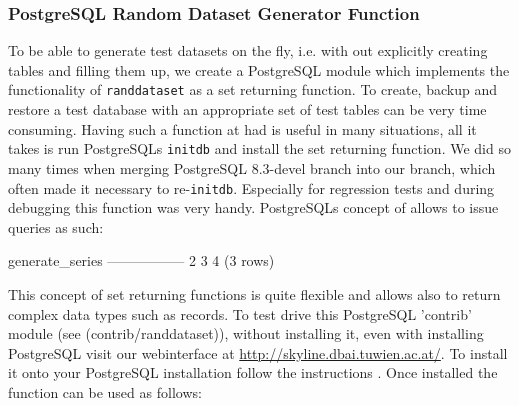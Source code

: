 \subsubsection{PostgreSQL Random Dataset Generator Function}

To be able to generate test datasets on the fly, i.e. with out
explicitly creating tables and filling them up, we create a PostgreSQL
module which implements the functionality of \texttt{randdataset} as a
set returning function. To create, backup and restore a test database
with an appropriate set of test tables can be very time
consuming. Having such a function at had is useful in many situations,
all it takes is run PostgreSQLs \texttt{initdb} and install the set
returning function. We did so many times when merging PostgreSQL
8.3-devel branch into our branch, which often made it necessary to
re-\texttt{initdb}. Especially for regression tests and during
debugging this function was very handy. PostgreSQLs concept of
 allows to
issue queries as such:

\begin{interactive}
 generate_series
-----------------
               2
               3
               4
(3 rows)
\end{interactive}

This concept of set returning functions is quite flexible and allows
also to return complex data types such as records. To test drive this
PostgreSQL 'contrib' module (see
\srcref(contrib/randdataset)), without installing it, even with
installing PostgreSQL visit our webinterface at
\url{http://skyline.dbai.tuwien.ac.at/}. To install it onto your
PostgreSQL installation follow the instructions
. Once installed the
function can be used as follows:


